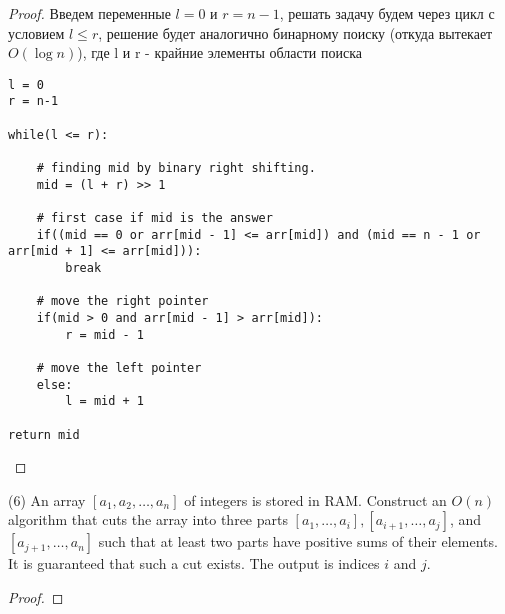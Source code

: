 \begin{proof}
Введем переменные $l=0$ и $r=n-1$, решать задачу будем через цикл с условием $l \leq r$, решение будет аналогично бинарному поиску (откуда вытекает $O(\log n)$), где l и r - крайние элементы области поиска
\begin{verbatim}
l = 0
r = n-1

while(l <= r):

    # finding mid by binary right shifting.
    mid = (l + r) >> 1

    # first case if mid is the answer
    if((mid == 0 or arr[mid - 1] <= arr[mid]) and (mid == n - 1 or arr[mid + 1] <= arr[mid])):
        break

    # move the right pointer
    if(mid > 0 and arr[mid - 1] > arr[mid]):
        r = mid - 1

    # move the left pointer
    else:
        l = mid + 1

return mid
\end{verbatim}
\end{proof}
\vskip 0.4in




\begin{prob}
(6) An array $\left[a_1, a_2, \ldots, a_n\right]$ of integers is stored in RAM. Construct an $O(n)$ algorithm that cuts the array into three parts $\left[a_1, \ldots, a_i\right],\left[a_{i+1}, \ldots, a_j\right]$, and $\left[a_{j+1}, \ldots, a_n\right]$ such that at least two parts have positive sums of their elements. It is guaranteed that such a cut exists. The output is indices $i$ and $j$.
\end{prob}

\begin{proof}
\end{proof}

\begin{comment}
Сперва за $O(n)$ мы можем проверить положительность $a_1, a_1 + a_2, \ldots, a_1 + \ldots + a_{n-2}$, и положительность $a_n, a_n + a_{n-1}, \ldots, a_n + \ldots + a_3$, заметим, что хотя бы одна из всех этих сумм положительна (иначе у нас нет положительного участка с концом в $a_1$ или $a_n$, но тогда каким бы ни было деление на 3 множества, хотя бы 2 из них будут отрицательными, что противоречит условию)
Рассмотрим первую встретившуюся такую сумму, без ограничения общности предположим что это $a_1 + \ldots + a_k$, если средин сумм $a_n, a_n + a_{n-1}, \ldots, a_n + \ldots + a_{k+1}$ нет положительных, то рассмотрим участки $a_{k+1}, a_{k+1} + a_{k+2}, \ldots$ среди них должен быть положительный, иначе
\end{comment}